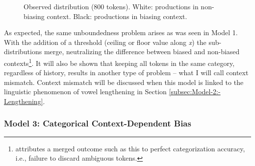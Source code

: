 \begin{figure}[H]

\begin{raggedright}
\hfill{}\caption{\label{fig:End context mismatch}Observed distribution (800 tokens).
White: productions in non-biasing context. Black: productions in biasing
context. }
\par\end{raggedright}
\end{figure}

As expected, the same unboundedness problem arises as was seen in
Model 1. With the addition of a threshold (ceiling or floor value
along \emph{x}) the sub-distributions merge, neutralizing the difference
between biased and non-biased contexts\footnote{\citet{DBLP:journals/corr/Tupper14a} attributes a merged outcome
such as this to perfect categorization accuracy, i.e., failure to
discard ambiguous tokens. }. It will also be shown that keeping all tokens in the same category,
regardless of history, results in another type of problem – what I
will call context mismatch. Context mismatch will be discussed when
this model is linked to the linguistic phenomenon of vowel lengthening
in Section \ref{subsec:Model-2:-Lengthening}. 

\subsubsection{\label{subsec:Model-3:-Categorical}Model 3: Categorical Context-Dependent
Bias}

